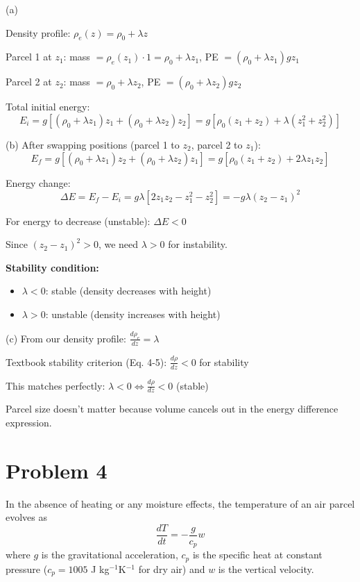 \documentclass[letterpaper, 11pt]{article}
\newcommand{\1}{\mathds{1}}	%
\theoremstyle{definition}
\begin{document}
(a)

Density profile: $\rho_e(z) = \rho_0 + \lambda z$

Parcel 1 at $z_1$: mass $= \rho_e(z_1) \cdot 1 = \rho_0 + \lambda z_1$, PE $= (\rho_0 + \lambda z_1)gz_1$

Parcel 2 at $z_2$: mass $= \rho_0 + \lambda z_2$, PE $= (\rho_0 + \lambda z_2)gz_2$

Total initial energy:
\begin{equation*}
E_i = g[(\rho_0 + \lambda z_1)z_1 + (\rho_0 + \lambda z_2)z_2] = g[\rho_0(z_1 + z_2) + \lambda(z_1^2 + z_2^2)]
\end{equation*}

(b)
After swapping positions (parcel 1 to $z_2$, parcel 2 to $z_1$):
\begin{equation*}
E_f = g[(\rho_0 + \lambda z_1)z_2 + (\rho_0 + \lambda z_2)z_1] = g[\rho_0(z_1 + z_2) + 2\lambda z_1 z_2]
\end{equation*}

Energy change:
\begin{equation*}
\Delta E = E_f - E_i = g\lambda[2z_1z_2 - z_1^2 - z_2^2] = -g\lambda(z_2 - z_1)^2
\end{equation*}

For energy to decrease (unstable): $\Delta E < 0$

Since $(z_2 - z_1)^2 > 0$, we need $\lambda > 0$ for instability.

\textbf{Stability condition:}
\begin{itemize}
\item $\lambda < 0$: stable (density decreases with height)
\item $\lambda > 0$: unstable (density increases with height)
\end{itemize}
(c)
From our density profile: $\frac{d\rho_e}{dz} = \lambda$

Textbook stability criterion (Eq. 4-5): $\frac{d\rho}{dz} < 0$ for stability

This matches perfectly: $\lambda < 0 \Leftrightarrow \frac{d\rho}{dz} < 0$ (stable)

Parcel size doesn't matter because volume cancels out in the energy difference expression.

\section*{Problem 4}
In the absence of heating or any moisture effects, the temperature of an air parcel evolves as
\begin{equation*}
\frac{dT}{dt} = -\frac{g}{c_p}w
\end{equation*}
where $g$ is the gravitational acceleration, $c_p$ is the specific heat at constant pressure ($c_p = 1005$ J kg$^{-1}$K$^{-1}$ for dry air) and $w$ is the vertical velocity.
\end{document}
